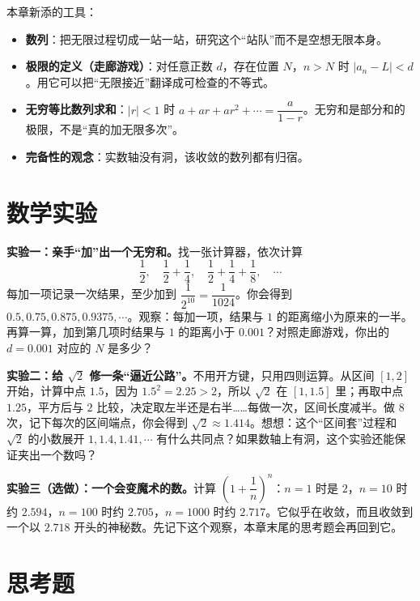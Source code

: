 \begin{toolbox}
本章新添的工具：
\begin{itemize}
  \item \textbf{数列}：把无限过程切成一站一站，研究这个“站队”而不是空想无限本身。
  \item \textbf{极限的定义（走廊游戏）}：对任意正数 $d$，存在位置 $N$，$n>N$ 时 $|a_n-L|<d$。用它可以把“无限接近”翻译成可检查的不等式。
  \item \textbf{无穷等比数列求和}：$|r|<1$ 时 $a+ar+ar^2+\cdots=\dfrac{a}{1-r}$。无穷和是部分和的极限，不是“真的加无限多次”。
  \item \textbf{完备性的观念}：实数轴没有洞，该收敛的数列都有归宿。
\end{itemize}
\end{toolbox}

\section{数学实验}

\begin{shiyan}
\textbf{实验一：亲手“加”出一个无穷和。}找一张计算器，依次计算
\[
\frac{1}{2},\quad \frac{1}{2}+\frac{1}{4},\quad \frac{1}{2}+\frac{1}{4}+\frac{1}{8},\quad \cdots
\]
每加一项记录一次结果，至少加到 $\dfrac{1}{2^{10}}=\dfrac{1}{1024}$。你会得到 $0.5,0.75,0.875,0.9375,\cdots$。观察：每加一项，结果与 $1$ 的距离缩小为原来的一半。再算一算，加到第几项时结果与 $1$ 的距离小于 $0.001$？对照走廊游戏，你出的 $d=0.001$ 对应的 $N$ 是多少？

\textbf{实验二：给 $\sqrt{2}$ 修一条“逼近公路”。}不用开方键，只用四则运算。从区间 $[1,2]$ 开始，计算中点 $1.5$，因为 $1.5^2=2.25>2$，所以 $\sqrt{2}$ 在 $[1,1.5]$ 里；再取中点 $1.25$，平方后与 $2$ 比较，决定取左半还是右半……每做一次，区间长度减半。做 $8$ 次，记下每次的区间端点，你会得到 $\sqrt{2}\approx 1.414$。想想：这个“区间套”过程和 $\sqrt{2}$ 的小数展开 $1,1.4,1.41,\cdots$ 有什么共同点？如果数轴上有洞，这个实验还能保证夹出一个数吗？

\textbf{实验三（选做）：一个会变魔术的数。}计算 $\left(1+\dfrac{1}{n}\right)^n$：$n=1$ 时是 $2$，$n=10$ 时约 $2.594$，$n=100$ 时约 $2.705$，$n=1000$ 时约 $2.717$。它似乎在收敛，而且收敛到一个以 $2.718$ 开头的神秘数。先记下这个观察，本章末尾的思考题会再回到它。
\end{shiyan}

\section*{思考题}

